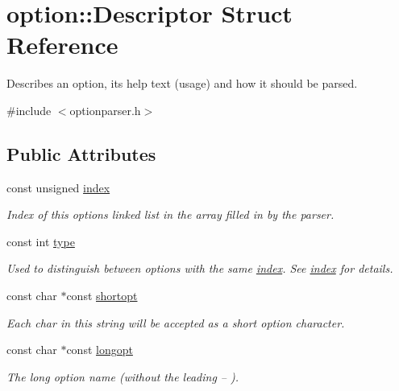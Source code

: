 \hypertarget{structoption_1_1_descriptor}{}\section{option\+:\+:Descriptor Struct Reference}
\label{structoption_1_1_descriptor}


Describes an option, its help text (usage) and how it should be parsed.  




{\ttfamily \#include $<$optionparser.\+h$>$}

\subsection*{Public Attributes}
\begin{DoxyCompactItemize}
\item 
const unsigned \hyperlink{structoption_1_1_descriptor_a1fee8ac44f529c99ac2b1149b4c391b1}{index}
\begin{DoxyCompactList}\small\item\em Index of this option\textquotesingle{}s linked list in the array filled in by the parser. \end{DoxyCompactList}\item 
const int \hyperlink{structoption_1_1_descriptor_a1b220dabd8aad075fa441a80f9b9343c}{type}
\begin{DoxyCompactList}\small\item\em Used to distinguish between options with the same \hyperlink{structoption_1_1_descriptor_a1fee8ac44f529c99ac2b1149b4c391b1}{index}. See \hyperlink{structoption_1_1_descriptor_a1fee8ac44f529c99ac2b1149b4c391b1}{index} for details. \end{DoxyCompactList}\item 
const char $\ast$const \hyperlink{structoption_1_1_descriptor_a0dba4ccca59c19d6ed4081391fca5adb}{shortopt}
\begin{DoxyCompactList}\small\item\em Each char in this string will be accepted as a short option character. \end{DoxyCompactList}\item 
const char $\ast$const \hyperlink{structoption_1_1_descriptor_a470c449dfa894c9bfda2dae026142b4b}{longopt}
\begin{DoxyCompactList}\small\item\em The long option name (without the leading {\ttfamily --} ). \end{DoxyCompactList}\item 

\end{DoxyCompactItemize}
